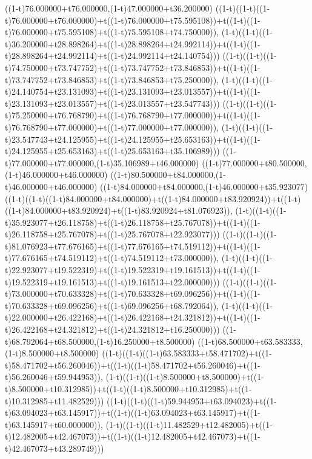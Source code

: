((1-t)76.000000+t76.000000,(1-t)47.000000+t36.200000)
((1-t)((1-t)((1-t)76.000000+t76.000000)+t((1-t)76.000000+t75.595108))+t((1-t)((1-t)76.000000+t75.595108)+t((1-t)75.595108+t74.750000)),                                     (1-t)((1-t)((1-t)36.200000+t28.898264)+t((1-t)28.898264+t24.992114))+t((1-t)((1-t)28.898264+t24.992114)+t((1-t)24.992114+t24.140754)))
((1-t)((1-t)((1-t)74.750000+t73.747752)+t((1-t)73.747752+t73.846853))+t((1-t)((1-t)73.747752+t73.846853)+t((1-t)73.846853+t75.250000)),                                     (1-t)((1-t)((1-t)24.140754+t23.131093)+t((1-t)23.131093+t23.013557))+t((1-t)((1-t)23.131093+t23.013557)+t((1-t)23.013557+t23.547743)))
((1-t)((1-t)((1-t)75.250000+t76.768790)+t((1-t)76.768790+t77.000000))+t((1-t)((1-t)76.768790+t77.000000)+t((1-t)77.000000+t77.000000)),                                     (1-t)((1-t)((1-t)23.547743+t24.125955)+t((1-t)24.125955+t25.653163))+t((1-t)((1-t)24.125955+t25.653163)+t((1-t)25.653163+t35.106989)))
((1-t)77.000000+t77.000000,(1-t)35.106989+t46.000000)
((1-t)77.000000+t80.500000,(1-t)46.000000+t46.000000)
((1-t)80.500000+t84.000000,(1-t)46.000000+t46.000000)
((1-t)84.000000+t84.000000,(1-t)46.000000+t35.923077)
((1-t)((1-t)((1-t)84.000000+t84.000000)+t((1-t)84.000000+t83.920924))+t((1-t)((1-t)84.000000+t83.920924)+t((1-t)83.920924+t81.076923)),                                     (1-t)((1-t)((1-t)35.923077+t26.118758)+t((1-t)26.118758+t25.767078))+t((1-t)((1-t)26.118758+t25.767078)+t((1-t)25.767078+t22.923077)))
((1-t)((1-t)((1-t)81.076923+t77.676165)+t((1-t)77.676165+t74.519112))+t((1-t)((1-t)77.676165+t74.519112)+t((1-t)74.519112+t73.000000)),                                     (1-t)((1-t)((1-t)22.923077+t19.522319)+t((1-t)19.522319+t19.161513))+t((1-t)((1-t)19.522319+t19.161513)+t((1-t)19.161513+t22.000000)))
((1-t)((1-t)((1-t)73.000000+t70.633328)+t((1-t)70.633328+t69.096256))+t((1-t)((1-t)70.633328+t69.096256)+t((1-t)69.096256+t68.792064)),                                     (1-t)((1-t)((1-t)22.000000+t26.422168)+t((1-t)26.422168+t24.321812))+t((1-t)((1-t)26.422168+t24.321812)+t((1-t)24.321812+t16.250000)))
((1-t)68.792064+t68.500000,(1-t)16.250000+t8.500000)
((1-t)68.500000+t63.583333,(1-t)8.500000+t8.500000)
((1-t)((1-t)((1-t)63.583333+t58.471702)+t((1-t)58.471702+t56.260046))+t((1-t)((1-t)58.471702+t56.260046)+t((1-t)56.260046+t59.944953)),                                     (1-t)((1-t)((1-t)8.500000+t8.500000)+t((1-t)8.500000+t10.312985))+t((1-t)((1-t)8.500000+t10.312985)+t((1-t)10.312985+t11.482529)))
((1-t)((1-t)((1-t)59.944953+t63.094023)+t((1-t)63.094023+t63.145917))+t((1-t)((1-t)63.094023+t63.145917)+t((1-t)63.145917+t60.000000)),                                     (1-t)((1-t)((1-t)11.482529+t12.482005)+t((1-t)12.482005+t42.467073))+t((1-t)((1-t)12.482005+t42.467073)+t((1-t)42.467073+t43.289749)))
